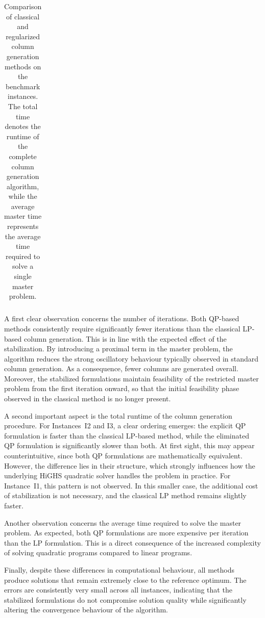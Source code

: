 \documentclass{book}
\theoremstyle{definition}
\newcounter{algorithm_}
\numberwithin{algorithm_}{chapter}
\begin{document}
{\begin{table}[ht]
\begin{tabular}{c l c c c c c}
\hline
\end{tabular}

\caption{Comparison of classical and regularized column generation methods on the benchmark instances. The total time denotes the runtime of the complete column generation algorithm, while the average master time represents the average time required to solve a single master problem.}
\label{tab:cg_qp_comparison}

\end{table}

A first clear observation concerns the number of iterations. Both QP-based methods consistently require significantly fewer iterations than the classical LP-based column generation. This is in line with the expected effect of the stabilization. By introducing a proximal term in the master problem, the algorithm reduces the strong oscillatory behaviour typically observed in standard column generation. As a consequence, fewer columns are generated overall. Moreover, the stabilized formulations maintain feasibility of the restricted master problem from the first iteration onward, so that the initial feasibility phase observed in the classical method is no longer present.

\bigskip

A second important aspect is the total runtime of the column generation procedure. For Instances~I2 and I3, a clear ordering emerges: the explicit QP formulation is faster than the classical LP-based method, while the eliminated QP formulation is significantly slower than both. At first sight, this may appear counterintuitive, since both QP formulations are mathematically equivalent. However, the difference lies in their structure, which strongly influences how the underlying HiGHS quadratic solver handles the problem in practice. For Instance~I1, this pattern is not observed. In this smaller case, the additional cost of stabilization is not necessary, and the classical LP method remains slightly faster.

\bigskip

Another observation concerns the average time required to solve the master problem. As expected, both QP formulations are more expensive per iteration than the LP formulation. This is a direct consequence of the increased complexity of solving quadratic programs compared to linear programs.

\bigskip

Finally, despite these differences in computational behaviour, all methods produce solutions that remain extremely close to the reference optimum. The errors are consistently very small across all instances, indicating that the stabilized formulations do not compromise solution quality while significantly altering the convergence behaviour of the algorithm.


}
\end{document}
